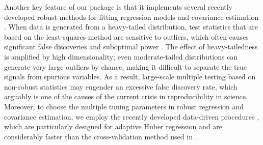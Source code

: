 Another key feature of our package is that it implements several recently developed robust methods for fitting regression models \citep{ZBFL2017, SZF2020} and covariance estimation \citep{KMRSZ2019}. When data is generated from a heavy-tailed distribution, test statistics that are based on the least-squares method are sensitive to outliers, which often causes significant false discoveries and suboptimal power \citep{ZBFL2017}. The effect of heavy-tailedness is amplified by high dimensionality; even moderate-tailed distributions can generate very large outliers by chance, making it difficult to separate the true signals from spurious variables. As a result, large-scale multiple testing based on non-robust statistics may engender an excessive false discovery rate, which arguably is one of the causes of the current crisis in reproducibility in science. Moreover, to choose the multiple tuning parameters in robust regression and covariance estimation,  we employ the recently developed data-driven procedures \citep{KMRSZ2019}, which are particularly designed for adaptive Huber regression and are considerably faster than the cross-validation method used in \cite{FKSZ2017}.






